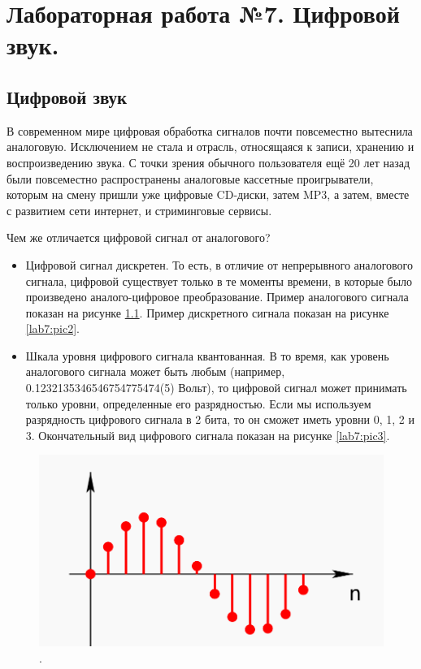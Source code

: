 \chapter{Лабораторная работа №7. Цифровой звук.}

\section{Цифровой звук}

В современном мире цифровая обработка сигналов почти повсеместно вытеснила аналоговую. Исключением не стала и отрасль, относящаяся к записи, хранению и воспроизведению звука. С точки зрения обычного пользователя ещё 20 лет назад были повсеместно распространены аналоговые кассетные проигрыватели, которым на смену пришли уже цифровые CD-диски, затем MP3, а затем, вместе с развитием сети интернет, и стриминговые сервисы.


Чем же отличается цифровой сигнал от аналогового?
\begin{itemize}
	\item Цифровой сигнал дискретен. То есть, в отличие от непрерывного аналогового сигнала, цифровой существует только в те моменты времени, в которые было произведено аналого-цифровое преобразование. Пример аналогового сигнала показан на рисунке \ref{lab7:pic1}. Пример дискретного сигнала показан на рисунке \ref{lab7:pic2}. 
	\item Шкала уровня цифрового сигнала квантованная. В то время, как уровень аналогового сигнала может быть любым (например, 0.1232135346546754775474(5) Вольт), то цифровой сигнал может принимать только уровни, определенные его разрядностью. Если мы используем разрядность цифрового сигнала в 2 бита, то он сможет иметь уровни 0, 1, 2 и 3. Окончательный вид цифрового сигнала показан на рисунке \ref{lab7:pic3}.
\end{itemize}



\begin{figure}[H]
	\centering
	\includegraphics [width=1\textwidth] {images/lab_7/discrete.png}
	\caption{.}
	\label{lab7:pic1}
\end{figure}



